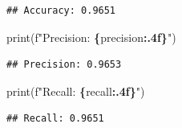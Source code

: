 \documentclass[
]{book}
\newenvironment{Shaded}{\begin{snugshade}}{\end{snugshade}}
\newcommand{\BuiltInTok}[1]{#1}
\newcommand{\NormalTok}[1]{#1}
\newcommand{\SpecialCharTok}[1]{\textcolor[rgb]{0.81,0.36,0.00}{\textbf{#1}}}
\newcommand{\SpecialStringTok}[1]{\textcolor[rgb]{0.31,0.60,0.02}{#1}}
\begin{document}
\begin{verbatim}
## Accuracy: 0.9651
\end{verbatim}

\begin{Shaded}
\begin{Highlighting}[]
\BuiltInTok{print}\NormalTok{(}\SpecialStringTok{f"Precision: }\SpecialCharTok{\{}\NormalTok{precision}\SpecialCharTok{:.4f\}}\SpecialStringTok{"}\NormalTok{)}
\end{Highlighting}
\end{Shaded}

\begin{verbatim}
## Precision: 0.9653
\end{verbatim}

\begin{Shaded}
\begin{Highlighting}[]
\BuiltInTok{print}\NormalTok{(}\SpecialStringTok{f"Recall: }\SpecialCharTok{\{}\NormalTok{recall}\SpecialCharTok{:.4f\}}\SpecialStringTok{"}\NormalTok{)}
\end{Highlighting}
\end{Shaded}

\begin{verbatim}
## Recall: 0.9651
\end{verbatim}

  
\end{document}
